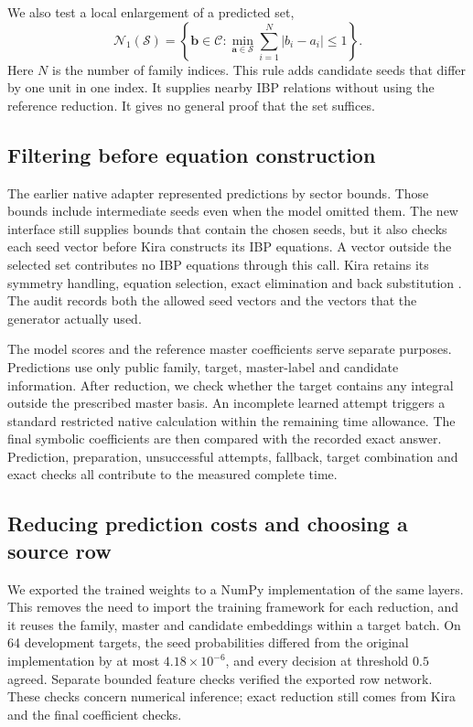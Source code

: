 We also test a local enlargement of a predicted set,
\begin{equation}
 \mathcal N_1(\mathcal S)
 =\left\{\boldsymbol b\in\mathcal C:
   \min_{\boldsymbol a\in\mathcal S}
   \sum_{i=1}^{N}|b_i-a_i|\leq1\right\}.
 \label{eq:seed-neighbours}
\end{equation}
Here $N$ is the number of family indices. This rule adds candidate seeds
that differ by one unit in one index. It supplies nearby IBP relations
without using the reference reduction. It gives no general proof that
the set suffices.

\subsection{Filtering before equation construction}
The earlier native adapter represented predictions by sector bounds.
Those bounds include intermediate seeds even when the model omitted
them. The new interface still supplies bounds that contain the chosen
seeds, but it also checks each seed vector before Kira constructs its
IBP equations. A vector outside the selected set contributes no IBP
equations through this call. Kira retains its symmetry handling,
equation selection, exact elimination and back substitution
\cite{Kira3}. The audit records both the allowed seed vectors and the
vectors that the generator actually used.

The model scores and the reference master coefficients serve separate
purposes. Predictions use only public family, target, master-label and
candidate information. After reduction, we check whether the target
contains any integral outside the prescribed master basis. An incomplete
learned attempt triggers a standard restricted native calculation within
the remaining time allowance. The final symbolic coefficients are then
compared with the recorded exact answer. Prediction, preparation,
unsuccessful attempts, fallback, target combination and exact checks
all contribute to the measured complete time.

\subsection{Reducing prediction costs and choosing a source row}
We exported the trained weights to a NumPy implementation of the same
layers. This removes the need to import the training framework for each
reduction, and it reuses the family, master and candidate embeddings
within a target batch. On 64 development targets, the seed probabilities
differed from the original implementation by at most
$4.18\times10^{-6}$, and every decision at threshold $0.5$ agreed.
Separate bounded feature checks verified the exported row network.
These checks concern numerical inference; exact reduction still comes
from Kira and the final coefficient checks.

